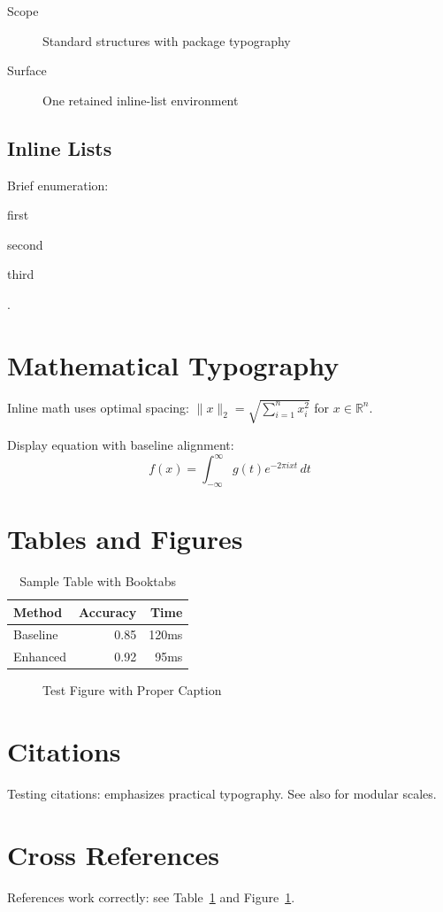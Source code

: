 \documentclass[11pt]{article}
\begin{document}
\begin{description}
\item[Scope] Standard structures with package typography
\item[Surface] One retained inline-list environment
\end{description}

\subsection{Inline Lists}
Brief enumeration: \begin{inlineitem}
\item first \item second \item third
\end{inlineitem}.

\section{Mathematical Typography}

Inline math uses optimal spacing: $\lVert x\rVert_2 = \sqrt{\sum_{i=1}^n x_i^2}$ for $x \in \mathbb{R}^n$.

Display equation with baseline alignment:
\begin{equation}
f(x) = \int_{-\infty}^{\infty} g(t) e^{-2\pi i x t} \, dt
\end{equation}

\section{Tables and Figures}

\begin{table}[tbp]
  \caption{Sample Table with Booktabs}
  \label{tab:test}
  \centering
  \begin{tabular}{@{}lrr@{}}
    \toprule
    Method & Accuracy & Time \\
    \midrule
    Baseline & 0.85 & 120ms \\
    Enhanced & 0.92 & 95ms \\
    \bottomrule
  \end{tabular}
\end{table}

\begin{figure}[tbp]
  \centering
  \caption{Test Figure with Proper Caption}
  \label{fig:test}
\end{figure}

\section{Citations}

Testing citations: \cite{butterick2019practical} emphasizes practical typography. 
See also \cite{brown2018flexible} for modular scales.

\section{Cross References}

References work correctly: see Table~\ref{tab:test} and Figure~\ref{fig:test}.

\printbibliography
\end{document}
